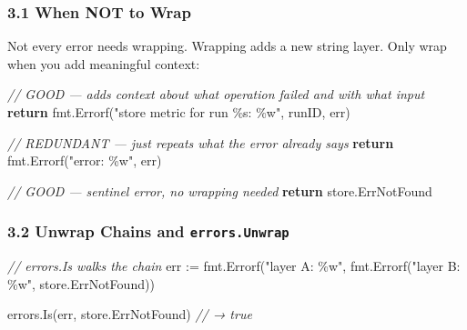 \documentclass[
]{article}
\newenvironment{Shaded}{}{}
\newcommand{\CommentTok}[1]{\textcolor[rgb]{0.38,0.63,0.69}{\textit{#1}}}
\newcommand{\ControlFlowTok}[1]{\textcolor[rgb]{0.00,0.44,0.13}{\textbf{#1}}}
\newcommand{\NormalTok}[1]{#1}
\newcommand{\OperatorTok}[1]{\textcolor[rgb]{0.40,0.40,0.40}{#1}}
\newcommand{\StringTok}[1]{\textcolor[rgb]{0.25,0.44,0.63}{#1}}
\begin{document}
\hypertarget{when-not-to-wrap}{%
\subsubsection{3.1 When NOT to Wrap}\label{when-not-to-wrap}}

Not every error needs wrapping. Wrapping adds a new string layer. Only
wrap when you add meaningful context:

\begin{Shaded}
\begin{Highlighting}[]
\CommentTok{// GOOD — adds context about what operation failed and with what input}
\ControlFlowTok{return}\NormalTok{ fmt}\OperatorTok{.}\NormalTok{Errorf}\OperatorTok{(}\StringTok{"store metric for run \%s: \%w"}\OperatorTok{,}\NormalTok{ runID}\OperatorTok{,}\NormalTok{ err}\OperatorTok{)}

\CommentTok{// REDUNDANT — just repeats what the error already says}
\ControlFlowTok{return}\NormalTok{ fmt}\OperatorTok{.}\NormalTok{Errorf}\OperatorTok{(}\StringTok{"error: \%w"}\OperatorTok{,}\NormalTok{ err}\OperatorTok{)}

\CommentTok{// GOOD — sentinel error, no wrapping needed}
\ControlFlowTok{return}\NormalTok{ store}\OperatorTok{.}\NormalTok{ErrNotFound}
\end{Highlighting}
\end{Shaded}

\hypertarget{unwrap-chains-and-errors.unwrap}{%
\subsubsection{\texorpdfstring{3.2 Unwrap Chains and
\texttt{errors.Unwrap}}{3.2 Unwrap Chains and errors.Unwrap}}\label{unwrap-chains-and-errors.unwrap}}

\begin{Shaded}
\begin{Highlighting}[]
\CommentTok{// errors.Is walks the chain}
\NormalTok{err }\OperatorTok{:=}\NormalTok{ fmt}\OperatorTok{.}\NormalTok{Errorf}\OperatorTok{(}\StringTok{"layer A: \%w"}\OperatorTok{,}\NormalTok{ fmt}\OperatorTok{.}\NormalTok{Errorf}\OperatorTok{(}\StringTok{"layer B: \%w"}\OperatorTok{,}\NormalTok{ store}\OperatorTok{.}\NormalTok{ErrNotFound}\OperatorTok{))}

\NormalTok{errors}\OperatorTok{.}\NormalTok{Is}\OperatorTok{(}\NormalTok{err}\OperatorTok{,}\NormalTok{ store}\OperatorTok{.}\NormalTok{ErrNotFound}\OperatorTok{)} \CommentTok{// → true}
\end{Highlighting}
\end{Shaded}
\end{document}
